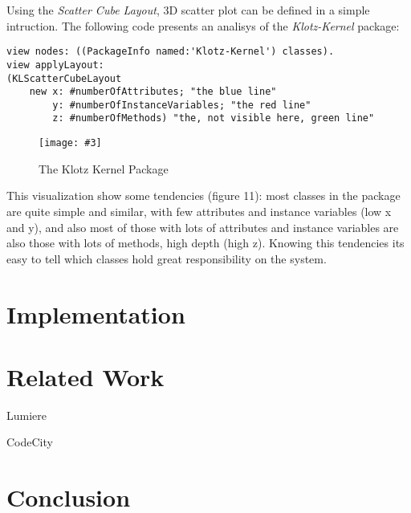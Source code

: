 \documentclass[runningheads]{llncs}
\newcommand{\fig}[4]{
	\begin{figure}[#1]
		\centering
		\texttt{[image: \#3]}
		\caption{\label{fig:#3}#4}
	\end{figure}}
\newcommand{\seclabel}[1]{\label{sec:#1}}
\begin{document}
Using the \emph{Scatter Cube Layout}, 3D scatter plot can be defined
in a simple intruction. The following code presents an analisys of
the \emph{Klotz-Kernel} package:
\begin{lstlisting}
view nodes: ((PackageInfo named:'Klotz-Kernel') classes).
view applyLayout: 
(KLScatterCubeLayout 
	new x: #numberOfAttributes; "the blue line"
		y: #numberOfInstanceVariables; "the red line"
		z: #numberOfMethods) "the, not visible here, green line" 
\end{lstlisting}
\fig{}{0.6}{figure11.png}{The Klotz Kernel Package}
This visualization show some tendencies (figure 11):
most classes in the package are quite simple and similar,
with few attributes and instance variables (low x and y), and 
also most of those with lots of attributes and instance variables
are also those with lots of methods, high depth (high z). Knowing
this tendencies its easy to tell which classes hold great 
responsibility on the system.




\section{Implementation} \seclabel{implementation}

\section{Related Work} \seclabel{relatedwork}

Lumiere~\cite{Oliv09a}

CodeCity~\cite{Wett08d}

\section{Conclusion} \seclabel{conclusion}



%



\end{document}
